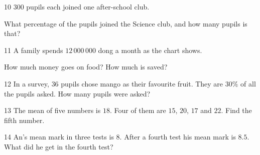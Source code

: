 \gap
\needspace{7.5cm}
\begin{probbox}{10}{\relax}
$300$ pupils each joined one after-school club.
\begin{center}
\end{center}
What percentage of the pupils joined the Science club, and how many pupils is that?
\end{probbox}
\gap
\needspace{7.5cm}
\begin{probbox}{11}{\relax}
A family spends $12\,000\,000$ dong a month as the chart shows.
\begin{center}
\end{center}
How much money goes on food? How much is saved?
\end{probbox}
\gap
\begin{probbox}{12}{\relax}
In a survey, $36$ pupils chose mango as their favourite fruit. They are $30\%$ of all the pupils asked. How many pupils were asked?
\end{probbox}
\gap
\begin{probbox}{13}{\relax}
The mean of five numbers is $18$. Four of them are $15$, $20$, $17$ and $22$. Find the fifth number.
\end{probbox}
\gap
\begin{probbox}{14}{\relax}
An's mean mark in three tests is $8$. After a fourth test his mean mark is $8.5$. What did he get in the fourth test?
\end{probbox}
